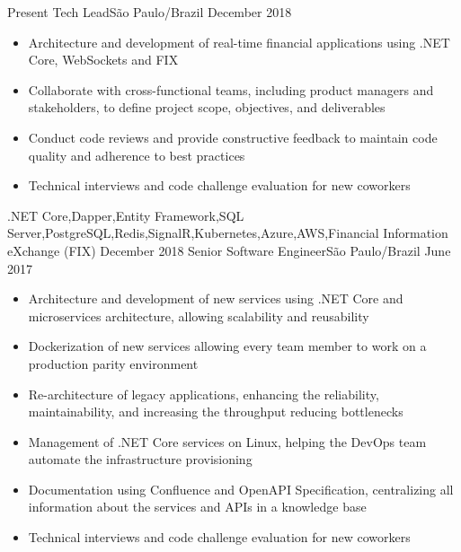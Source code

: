 
\begin{experiences}  
  \experience
    {Present}   {Tech Lead}{}{São Paulo/Brazil}
    {December 2018} {
                  \begin{itemize}
                    \item Architecture and development of real-time financial applications using .NET Core, WebSockets and FIX
                    \item Collaborate with cross-functional teams, including product managers and stakeholders, to define project scope, objectives, and deliverables
                    \item Conduct code reviews and provide constructive feedback to maintain code quality and adherence to best practices
                    \item Technical interviews and code challenge evaluation for new coworkers
                  \end{itemize}
                }
                {.NET Core,Dapper,Entity Framework,SQL Server,PostgreSQL,Redis,SignalR,Kubernetes,Azure,AWS,Financial Information eXchange (FIX)}
  \emptySeparator
  \experience
    {December 2018}   {Senior Software Engineer}{}{São Paulo/Brazil}
    {June 2017} {
                  \begin{itemize}
                    \item Architecture and development of new services using .NET Core and microservices architecture, allowing scalability and reusability 
                    \item Dockerization of new services allowing every team member to work on a production parity environment  
                    \item Re-architecture of legacy applications, enhancing the reliability, maintainability, and increasing the throughput reducing bottlenecks   
                    \item Management of .NET Core services on Linux, helping the DevOps team automate the infrastructure provisioning
                    \item Documentation using Confluence and OpenAPI Specification, centralizing all information about the services and APIs in a knowledge base 
                    \item Technical interviews and code challenge evaluation for new coworkers

\end{itemize}}
\end{experiences}
